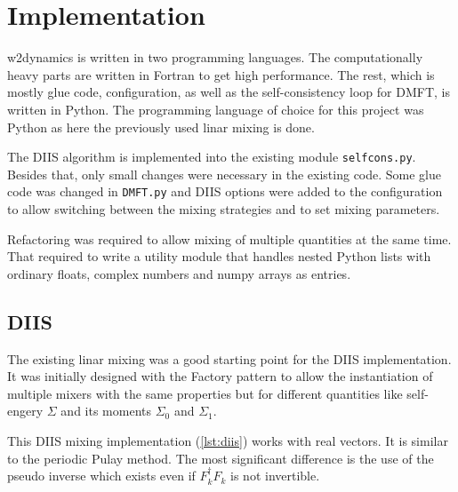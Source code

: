 \chapter{Implementation}
\label{ch:impl}
w2dynamics\cite{w2dyn}\cite{w2dyn_ref} is written in two programming languages. The computationally heavy parts are written in Fortran to get high performance. The rest, which is mostly glue code, configuration, as well as the self-consistency loop for DMFT, is written in Python. The programming language of choice for this project was Python as here the previously used linar mixing is done.

The DIIS algorithm is implemented into the existing module \texttt{selfcons.py}. Besides that, only small changes were necessary in the existing code. Some glue code was changed in \texttt{DMFT.py} and DIIS options were added to the configuration to allow switching between the mixing strategies and to set mixing parameters.

Refactoring was required to allow mixing of multiple quantities at the same time. That required to write a utility module that handles nested Python lists with ordinary floats, complex numbers and numpy arrays as entries.

\section{DIIS}
The existing linar mixing was a good starting point for the DIIS implementation. It was initially designed with the Factory pattern to allow the instantiation of multiple mixers with the same properties but for different quantities like self-engery $\Sigma$ and its moments $\Sigma_0$ and $\Sigma_1$.

This DIIS mixing implementation (\ref{lst:diis}) works with real vectors. It is similar to the periodic Pulay method\cite{diis_periodic}. The most significant difference is the use of the pseudo inverse which exists even if \(F_k^\dagger F_k\) is not invertible.

